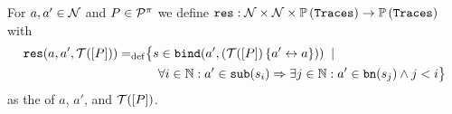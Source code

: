 \begin{definition}
\label{def_res_set}
For $a,a'\in\mathcal N$ and $P\in\mathcal P^{\pi}$ we define $\texttt{res}:\mathcal N\times\mathcal N\times\mathbb P\left(\mathtt{Traces}\right)\rightarrow\mathbb P\left(\mathtt{Traces}\right)$ with
\begin{align*}
	\res{a}{a'}{P}\define&\bigl\{s\in\bind{a'}{\left(\traces[P]\transp{a'}{a}\right)} \;\mid \\
				& \quad \forall{}i\in\N: a'\in\sub{s_i} \Rightarrow \exists{}j\in\N: a'\in\bn{s_j}\wedge{}j<i \bigr\}
\end{align*}
as the  of $a$, $a'$, and $\traces[P]$.
\end{definition}


